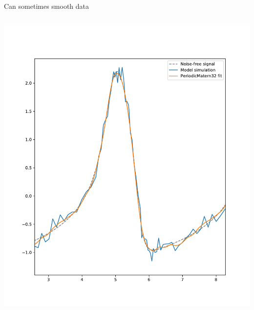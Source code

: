 \documentclass[presentation]{beamer}
\begin{document}
\begin{frame}[plain,label={sec:orgce8e801}]{Can sometimes smooth data}
\begin{columns}
\begin{column}{0.5\columnwidth}
\begin{center}
\includegraphics[width=1.1\textwidth]{./Matern2.pdf}
\end{center}
\end{column}
\end{columns}
\end{frame}
\end{document}
